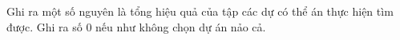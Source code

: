 Ghi ra một số nguyên là tổng hiệu quả của tập các dự có thể án thực hiện tìm được. Ghi ra số 0 nếu như không chọn dự án nảo cả.